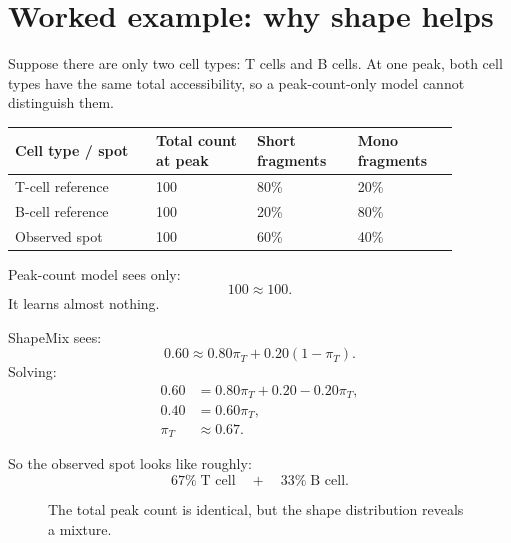 \documentclass[11pt]{article}
\begin{document}
\section{Worked example: why shape helps}

Suppose there are only two cell types: T cells and B cells.  At one peak, both cell types have the same total accessibility, so a peak-count-only model cannot distinguish them.

\begin{center}
\begin{tabular}{L{0.28\linewidth}C{0.2\linewidth}C{0.2\linewidth}C{0.2\linewidth}}
\toprule
Cell type / spot & Total count at peak & Short fragments & Mono fragments \\
\midrule
T-cell reference & 100 & 80\% & 20\% \\
B-cell reference & 100 & 20\% & 80\% \\
Observed spot & 100 & 60\% & 40\% \\
\bottomrule
\end{tabular}
\end{center}

Peak-count model sees only:
\[
100 \approx 100.
\]
It learns almost nothing.

ShapeMix sees:
\[
0.60 \approx 0.80\pi_T+0.20(1-\pi_T).
\]
Solving:
\begin{align*}
0.60 &= 0.80\pi_T+0.20-0.20\pi_T,\\
0.40 &= 0.60\pi_T,\\
\pi_T &\approx 0.67.
\end{align*}

So the observed spot looks like roughly:
\[
\boxed{67\%\;\text{T cell} \quad + \quad 33\%\;\text{B cell}.}
\]

\begin{figure}[H]
\centering
{}
\caption{The total peak count is identical, but the shape distribution reveals a mixture.}
\end{figure}
\end{document}
